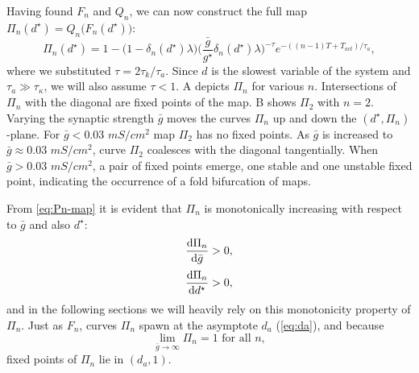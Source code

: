 Having found \(F_n\) and \(Q_n\), we can now construct the full map \(\Pi_n(d^\star)=Q_n\big(F_n(d^\star)\big)\):
\begin{equation}
	\label{eq:Pn-map}
	\Pi_n(d^\star) = 1 - \Big(1 - \delta_n(d^\star) \lambda \Big)
	\Big(\frac{\bar g}{g^\star}\delta_n(d^\star) \lambda \Big)^{-\tau}
	e^{-((n-1)T + T_{act})/\tau_a},
\end{equation}
where we substituted \(\tau = 2\tau_{k}/\tau_{a}\).
Since \(d\) is the slowest variable of the system and \(\tau_a \gg \tau_\kappa\), we will also assume \(\tau<1\).
A depicts \(\Pi_n\) for various \(n\).
Intersections of \(\Pi_{n}\) with the diagonal are fixed points of the map.
B shows \(\Pi_{2}\) with \(n=2\).
Varying the synaptic strength \(\bar g\) moves the curves \(\Pi_{n}\) up and down the \((d^{\star}, \Pi_{n})\)-plane.
For \(\bar g < 0.03\) \(\si{mS/cm^{2}}\) map \(\Pi_{2}\) has no fixed points.
As \(\bar g\) is increased to \(\bar g \approx 0.03\) \(\si{mS/cm^{2}}\), curve \(\Pi_{2}\) coalesces with the diagonal tangentially.
When \(\bar g > 0.03\) \(\si{mS/cm^{2}}\), a pair of fixed points emerge, one stable and one unstable fixed point, indicating the occurrence of a fold bifurcation of maps.


From \cref{eq:Pn-map} it is evident that \(\Pi_n\) is monotonically increasing with respect to \(\bar g\) and also \(d^\star\):
\begin{align}
	\label{eq:non-degen1}
	\dv{\Pi_n}{\bar g}  & >0, \\[0.5ex]
	\label{eq:dPidd}
	\dv{\Pi_n}{d^\star} & >0,
\end{align}
and in the following sections we will heavily rely on this monotonicity property of \(\Pi_n\).
Just as \(F_n\), curves \(\Pi_n\) spawn at the asymptote \(d_{a}\) (\cref{eq:da}), and because
\begin{equation}
	\lim_{\bar g \to \infty}\Pi_n = 1\text{ for all }n,
\end{equation}
fixed points of \(\Pi_n\) lie in \((d_{a}, 1)\).

